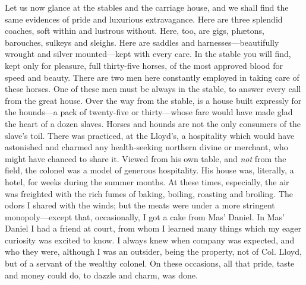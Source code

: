 Let us now glance at the stables and the carriage house, and we shall
find the same evidences of pride and luxurious extravagance. Here are
three splendid coaches, soft within and lustrous without. Here, too, are
gigs, phætons, barouches, sulkeys and sleighs. Here are saddles and
harnesses---beautifully wrought and silver mounted---kept with every
care. In the stable you will find, kept only for pleasure, full
thirty-five horses, of the most approved blood for speed and beauty.
There are two men here constantly employed in taking care of these
horses. One of these men must be always in the stable, to answer every
call from the great house. Over the way from the stable, is a house
built expressly for the hounds---a pack of twenty-five or thirty---whose
fare would have made glad the heart of a dozen slaves. Horses and hounds
are not the only consumers of the slave's toil. There was practiced, at
the Lloyd's, a hospitality which would have astonished and charmed any
health-seeking northern divine or merchant, who might have chanced to
share it. Viewed from his own table, and \emph{not} from the field, the
colonel was a model of generous hospitality. His house was, literally, a
hotel, for weeks during the summer months. At these times, especially,
the air was freighted with the rich fumes of baking, boiling, roasting
and broiling. The odors I shared with the winds; but the meats were
under a more stringent monopoly---except that, occasionally, I got a
cake from Mas' Daniel. In Mas' Daniel I had a friend at court, from whom
I learned many things {}which my eager curiosity was excited to know. I
always knew when company was expected, and who they were, although I was
an outsider, being the property, not of Col. Lloyd, but of a servant of
the wealthy colonel. On these occasions, all that pride, taste and money
could do, to dazzle and charm, was done.

